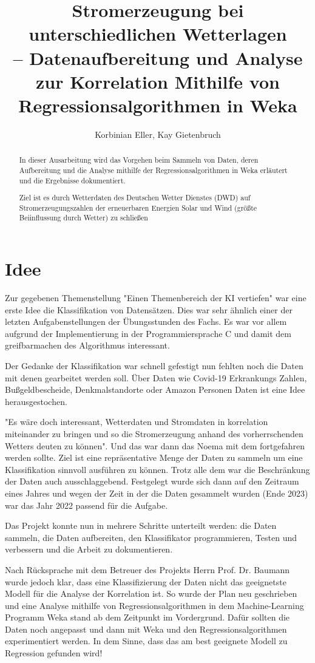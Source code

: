 \documentclass[letterpaper]{article} %
\title{Stromerzeugung bei unterschiedlichen Wetterlagen\\-- Datenaufbereitung und Analyse zur Korrelation Mithilfe von Regressionsalgorithmen in Weka}
\author {
    Korbinian Eller,
    Kay Gietenbruch
}
\begin{document}
\maketitle
\begin{abstract}
    In dieser Ausarbeitung wird das Vorgehen beim Sammeln von Daten, deren Aufbereitung und die Analyse mithilfe der Regressionsalgorithmen in Weka erläutert und die Ergebnisse dokumentiert.
    
    Ziel ist es durch Wetterdaten des Deutschen Wetter Dienstes (DWD) auf Stromerzeugungszahlen der erneuerbaren Energien Solar und Wind (größte Beiinflussung durch Wetter) zu schließen  
\end{abstract}
\section*{Idee}
    Zur gegebenen Themenstellung "Einen Themenbereich der KI vertiefen" war eine erste Idee die Klassifikation von Datensätzen. Dies war sehr ähnlich einer der letzten Aufgabenstellungen der Übungsstunden des Fachs. Es war vor allem aufgrund der Implementierung in der Programmiersprache C und damit dem greifbarmachen des Algorithmus interessant.

    Der Gedanke der Klassifikation war schnell gefestigt nun fehlten noch die Daten mit denen gearbeitet werden soll. Über Daten wie Covid-19 Erkrankungs Zahlen, Bußgeldbescheide, Denkmalstandorte oder Amazon Personen Daten ist eine Idee herausgestochen.

    "Es wäre doch interessant, Wetterdaten und Stromdaten in korrelation miteinander zu bringen und so die Stromerzeugung anhand des vorherrschenden Wetters deuten zu können". Und das war dann das Noema mit dem fortgefahren werden sollte. Ziel ist eine repräsentative Menge der Daten zu sammeln um eine Klassifikation sinnvoll ausführen zu können. Trotz alle dem war die Beschränkung der Daten auch ausschlaggebend. Festgelegt wurde sich dann auf den Zeitraum eines Jahres und wegen der Zeit in der die Daten gesammelt wurden (Ende 2023) war das Jahr 2022 passend für die Aufgabe.
    
    Das Projekt konnte nun in mehrere Schritte unterteilt werden: die Daten sammeln, die Daten aufbereiten, den Klassifikator programmieren, Testen und verbessern und die Arbeit zu dokumentieren.

    Nach Rücksprache mit dem Betreuer des Projekts Herrn Prof. Dr. Baumann wurde jedoch klar, dass eine Klassifizierung der Daten nicht das geeignetste Modell für die Analyse der Korrelation ist. So wurde der Plan neu geschrieben und eine Analyse mithilfe von Regressionsalgorithmen in dem Machine-Learning Programm Weka stand ab dem Zeitpunkt im Vordergrund. Dafür sollten die Daten noch angepasst und dann mit Weka und den Regressionsalgorithmen experimentiert werden. In dem Sinne, dass das am best geeignete Modell zu Regression gefunden wird!
\end{document}
